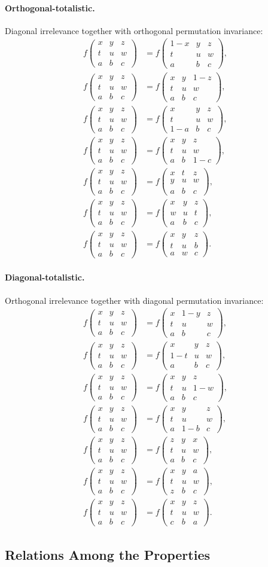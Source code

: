 \documentclass[11pt,a4paper]{article}
\newcommand{\nbhd}[9]{%
  \begin{smallmatrix}
  #1 & #2 & #3 \\
  #4 & #5 & #6 \\
  #7 & #8 & #9
  \end{smallmatrix}
}
\newcommand{\F}[1]{f\!\left(#1\right)}
\begin{document}
\paragraph{Orthogonal-totalistic.}
Diagonal irrelevance together with orthogonal permutation invariance:
\begin{align*}
\F{\nbhd{x}{y}{z}{t}{u}{w}{a}{b}{c}} &= \F{\nbhd{1-x}{y}{z}{t}{u}{w}{a}{b}{c}},\\
\F{\nbhd{x}{y}{z}{t}{u}{w}{a}{b}{c}} &= \F{\nbhd{x}{y}{1-z}{t}{u}{w}{a}{b}{c}},\\
\F{\nbhd{x}{y}{z}{t}{u}{w}{a}{b}{c}} &= \F{\nbhd{x}{y}{z}{t}{u}{w}{1-a}{b}{c}},\\
\F{\nbhd{x}{y}{z}{t}{u}{w}{a}{b}{c}} &= \F{\nbhd{x}{y}{z}{t}{u}{w}{a}{b}{1-c}},\\
\F{\nbhd{x}{y}{z}{t}{u}{w}{a}{b}{c}} &= \F{\nbhd{x}{t}{z}{y}{u}{w}{a}{b}{c}},\\
\F{\nbhd{x}{y}{z}{t}{u}{w}{a}{b}{c}} &= \F{\nbhd{x}{y}{z}{w}{u}{t}{a}{b}{c}},\\
\F{\nbhd{x}{y}{z}{t}{u}{w}{a}{b}{c}} &= \F{\nbhd{x}{y}{z}{t}{u}{b}{a}{w}{c}}.
\end{align*}

\paragraph{Diagonal-totalistic.}
Orthogonal irrelevance together with diagonal permutation invariance:
\begin{align*}
\F{\nbhd{x}{y}{z}{t}{u}{w}{a}{b}{c}} &= \F{\nbhd{x}{1-y}{z}{t}{u}{w}{a}{b}{c}},\\
\F{\nbhd{x}{y}{z}{t}{u}{w}{a}{b}{c}} &= \F{\nbhd{x}{y}{z}{1-t}{u}{w}{a}{b}{c}},\\
\F{\nbhd{x}{y}{z}{t}{u}{w}{a}{b}{c}} &= \F{\nbhd{x}{y}{z}{t}{u}{1-w}{a}{b}{c}},\\
\F{\nbhd{x}{y}{z}{t}{u}{w}{a}{b}{c}} &= \F{\nbhd{x}{y}{z}{t}{u}{w}{a}{1-b}{c}},\\
\F{\nbhd{x}{y}{z}{t}{u}{w}{a}{b}{c}} &= \F{\nbhd{z}{y}{x}{t}{u}{w}{a}{b}{c}},\\
\F{\nbhd{x}{y}{z}{t}{u}{w}{a}{b}{c}} &= \F{\nbhd{x}{y}{a}{t}{u}{w}{z}{b}{c}},\\
\F{\nbhd{x}{y}{z}{t}{u}{w}{a}{b}{c}} &= \F{\nbhd{x}{y}{z}{t}{u}{w}{c}{b}{a}}.
\end{align*}

\subsection{Relations Among the Properties}
\end{document}
